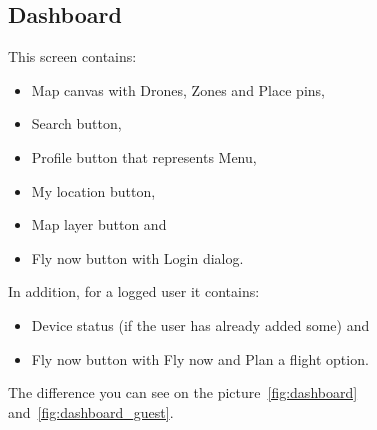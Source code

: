 \subsection{Dashboard}\label{subsec:dashboard2}
This screen contains:
\begin{itemize}
    \item Map canvas with Drones, Zones and Place pins,
    \item Search button,
    \item Profile button that represents Menu,
    \item My location button,
    \item Map layer button and
    \item Fly now button with Login dialog.
\end{itemize}
In addition, for a logged user it contains:
\begin{itemize}
    \item Device status (if the user has already added some) and
    \item Fly now button with Fly now and Plan a flight option.
\end{itemize}
The difference you can see on the picture~\ref{fig:dashboard} and~\ref{fig:dashboard_guest}.


